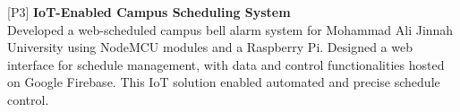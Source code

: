\begin{cventries}
\begin{rSection}{}
{\hspace{-1.5em}[P3]\hspace{1em}}{\bodyfont\bfseries\color{darktext} {IoT-Enabled Campus Scheduling System \hspace{1em} \href{https://maju-iot.web.app/}{\large{\faGlobe}}}}
\\\hspace{1.2em}Developed a web-scheduled campus bell alarm system for Mohammad Ali Jinnah University using NodeMCU modules and a Raspberry Pi. Designed a web interface for schedule management, with data and control functionalities hosted on Google Firebase. This IoT solution enabled automated and precise schedule control.
\end{rSection}

\end{cventries}